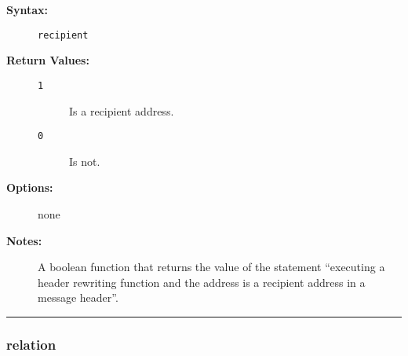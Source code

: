 \begin{description}
\item[{\bf Syntax:}] \mbox{}

{\tt recipient}

\item[{\bf Return Values:}] \mbox{}

\begin{description}
\item[{\tt 1}] \mbox{}

Is a recipient address.

\item[{\tt 0}] \mbox{}

Is not.

\end{description}


\item[{\bf Options:}] \mbox{}

none  

\item[{\bf Notes:}] \mbox{}

A boolean function that returns the value of 
the statement ``executing a header rewriting function and the address 
is a recipient address in a message header''.

\end{description}


\hrule
\subsubsection{relation}

